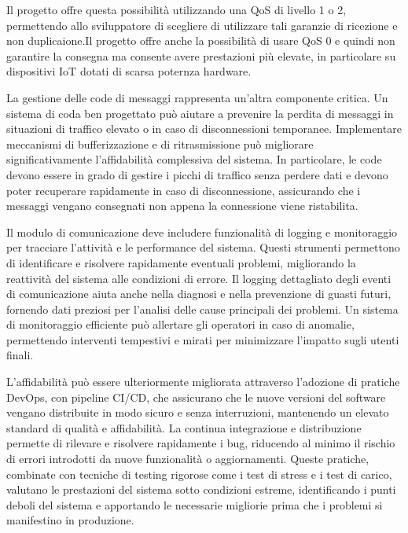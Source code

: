 \documentclass[12pt,a4paper,openright,twoside]{book}
\begin{document}
Il progetto offre questa possibilità utilizzando una \ac{QoS} di livello 1 o 2, permettendo allo sviluppatore di scegliere di utilizzare tali garanzie di ricezione 
e non duplicaione.Il progetto offre anche la possibilità di usare \ac{QoS} 0 e quindi non garantire la consegna ma consente avere prestazioni più elevate, 
in particolare su dispositivi \ac{IoT} dotati di scarsa poternza hardware.

La gestione delle code di messaggi rappresenta un'altra componente critica. Un sistema di coda ben progettato può aiutare a prevenire la perdita di messaggi in 
situazioni di traffico elevato o in caso di disconnessioni temporanee. Implementare meccanismi di bufferizzazione e di ritrasmissione può migliorare significativamente 
l'affidabilità complessiva del sistema. In particolare, le code devono essere in grado di gestire i picchi di traffico senza perdere dati e devono poter recuperare 
rapidamente in caso di disconnessione, assicurando che i messaggi vengano consegnati non appena la connessione viene ristabilita.

Il modulo di comunicazione deve includere funzionalità di logging e monitoraggio per tracciare l'attività e le performance del sistema. Questi strumenti permettono 
di identificare e risolvere rapidamente eventuali problemi, migliorando la reattività del sistema alle condizioni di errore. Il logging dettagliato degli eventi di 
comunicazione aiuta anche nella diagnosi e nella prevenzione di guasti futuri, fornendo dati preziosi per l'analisi delle cause principali dei problemi. 
Un sistema di monitoraggio efficiente può allertare gli operatori in caso di anomalie, permettendo interventi tempestivi e mirati per minimizzare l'impatto sugli utenti finali.

L'affidabilità può essere ulteriormente migliorata attraverso l'adozione di pratiche DevOps, con pipeline \ac{CI/CD}, che assicurano che le nuove versioni del software 
vengano distribuite in modo sicuro e senza interruzioni, mantenendo un elevato standard di qualità e affidabilità. La continua integrazione e distribuzione permette di 
rilevare e risolvere rapidamente i bug, riducendo al minimo il rischio di errori introdotti da nuove funzionalità o aggiornamenti. Queste pratiche, combinate con tecniche 
di testing rigorose come i test di stress e i test di carico, valutano le prestazioni del sistema sotto condizioni estreme, identificando i punti deboli del sistema e 
apportando le necessarie migliorie prima che i problemi si manifestino in produzione.
\end{document}
